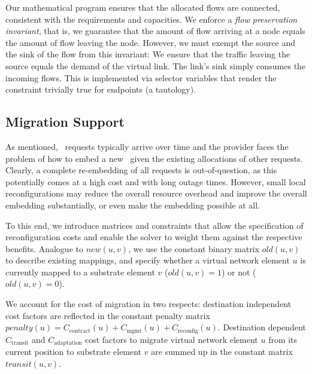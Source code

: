 \documentclass[conference,10pt]{IEEEtran}
\newcommand{\CloudNet}{\text{CloudNet}}
\newcommand{\mrm}{\mathrm}
\begin{document}
Our mathematical program ensures that the allocated flows are
connected, consistent with the requirements and capacities.
We enforce a \emph{flow
preservation invariant}, that is, we guarantee that the amount of
flow arriving at a node equals the amount of flow leaving the node.
However, we must exempt the source and the sink of the flow from
this invariant: We ensure that the traffic leaving the source equals
the demand of the virtual link. The link's sink simply consumes the
incoming flows. This is implemented via selector variables that
render the constraint trivially true for endpoints (a tautology).

\subsection{Migration Support} \label{ssec:map:approach:mig}

As mentioned, \CloudNet\ requests typically arrive over time and the provider
faces the problem of how to embed a new \CloudNet\ given the
existing allocations of other requests. Clearly, a complete
re-embedding of all requests is out-of-question, as this potentially
comes at a high cost and with long outage times. However, small
local reconfigurations may reduce the overall resource overhead and
improve the overall embedding substantially, or even make the
embedding possible at all.

To this end, we introduce matrices and constraints
that allow the specification of reconfiguration costs and enable the solver to weight them against the respective benefits.
Analogue to $new(u,v)$, we use the constant binary matrix $old(u,v)$ to
describe existing mappings, and
specify whether a virtual network element $u$ is currently mapped
to a substrate element $v$ ($old(u,v)=1$) or not ($old(u,v)=0$).

We account for the cost of migration in two respects: destination
independent cost factors are reflected in the constant penalty
matrix $penalty(u) = C_{\mrm{contract}}(u) + C_{\mrm{mgmt}}(u) + C_{\mrm{reconfig}}(u)$.
Destination dependent $C_{\mrm{transit}}$ and $C_{\mrm{adaptation}}$ cost factors to migrate
virtual network element $u$ from its current position
to substrate element $v$ are summed up in the constant matrix
$transit(u,v)$.
\end{document}
